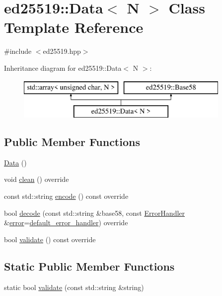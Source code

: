 \hypertarget{classed25519_1_1_data}{}\section{ed25519\+:\+:Data$<$ N $>$ Class Template Reference}
\label{classed25519_1_1_data}


{\ttfamily \#include $<$ed25519.\+hpp$>$}

Inheritance diagram for ed25519\+:\+:Data$<$ N $>$\+:\begin{figure}[H]
\begin{center}
\leavevmode
\includegraphics[height=2.000000cm]{classed25519_1_1_data}
\end{center}
\end{figure}
\subsection*{Public Member Functions}
\begin{DoxyCompactItemize}
\item 
\mbox{\hyperlink{classed25519_1_1_data_a2c637587095d6527cd4136926fb8b452}{Data}} ()
\item 
void \mbox{\hyperlink{classed25519_1_1_data_a22626c9e5a951dd673bfda8e78bf14fc}{clean}} () override
\item 
const std\+::string \mbox{\hyperlink{classed25519_1_1_data_a2dc2e23b950a10b168d7509a63ffca53}{encode}} () const override
\item 
bool \mbox{\hyperlink{classed25519_1_1_data_a281d932d3c3fe7fd40ce86ea7eff559b}{decode}} (const std\+::string \&base58, const \mbox{\hyperlink{namespaceed25519_a6ba572942b3c18591fc869d52a6b16e6}{Error\+Handler}} \&\mbox{\hyperlink{namespaceed25519_ac93d0b5156eaca22197055e902920bc4}{error}}=\mbox{\hyperlink{namespaceed25519_a7c7bb6ed17541162959c33ed3e3b15fb}{default\+\_\+error\+\_\+handler}}) override
\item 
bool \mbox{\hyperlink{classed25519_1_1_data_ac365c9862b45379c677449b622c74da5}{validate}} () const override
\end{DoxyCompactItemize}
\subsection*{Static Public Member Functions}
\begin{DoxyCompactItemize}
\item 
static bool \mbox{\hyperlink{classed25519_1_1_data_ade9c93cb08f9d60aa45e75821ed1bcbe}{validate}} (const std\+::string \&string)
\end{DoxyCompactItemize}


